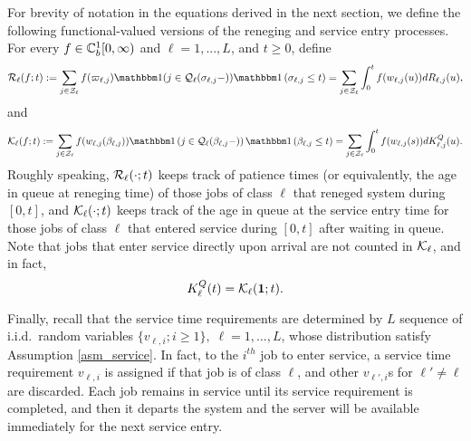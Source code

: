 \documentclass{article}
\theoremstyle{definition}
\numberwithin{equation}{section}
\begin{document}
For brevity of notation in the equations derived in the next section, we define the following functional-valued versions of the reneging and service entry processes. For every $f\in\mathbb{C}_b^{1}[0,\infty)$ and $\ell=1,...,L$, and $t\geq0$, define
\begin{equation}\label{def_renegC}
  \renegC_\ell(f;t) :=\sum_{j\in\indexSet_\ell} f(\patience_{\ell,j})\indicil{j\in\inque_\ell(\renegtime_{\ell,j}-)}\indic{\renegtime_{\ell,j}\leq t}=  \sum_{j\in\indexSet_\ell} \int_0^tf(w_{\ell,j}(u))d\reneg_{\ell,j}(u),
\end{equation}
and
\begin{equation}\label{def_entryC}
\entryC_\ell(f;t):= \sum_{j\in\indexSet_\ell} f(w_{\ell,j}(\entrytime_{\ell,j}))\indic{j\in\inque_\ell(\entrytime_{\ell,j}-)}\indic{\entrytime_{\ell,j}\leq t} = \sum_{j\in\indexSet_\ell} \int_0^tf(w_{\ell,j}(s))d\entry^Q_{\ell,j}(u).
\end{equation}
Roughly speaking, $\mathcal{R}_\ell(\cdot;t)$ keeps track of patience times (or equivalently, the age in queue at reneging time) of those jobs of class $\ell$ that reneged system during $[0,t]$, and $\mathcal{K}_\ell(\cdot;t)$ keeps track of the age in queue at the service entry time for those jobs of class $\ell$ that entered service during $[0,t]$ after waiting in queue. Note that jobs that enter service directly upon arrival are not counted in $\mathcal{K}_\ell$, and in fact,
\begin{equation}\label{KQ_Curly}
	\entry^Q_{\ell}(t)=\entryC_\ell(\f1;t).
\end{equation}


Finally, recall that the service time requirements are determined by $L$ sequence of i.i.d.\ random variables $\{v_{\ell,i};i\geq1\},\;\ell=1,...,L$, whose distribution satisfy Assumption \ref{asm_service}. In fact, to the $i^{th}$ job to enter service, a service time requirement $v_{\ell,i}$ is assigned if that job is of class $\ell$, and other $v_{\ell',i}$s for $\ell'\neq\ell$ are discarded. Each job remains in service until its service requirement is completed, and then it departs the system and the server will be available immediately for the next service entry.
\end{document}
